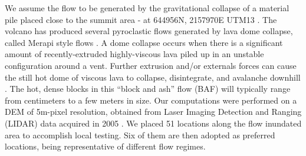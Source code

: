 \documentclass{article}
\begin{document}
We assume the flow to be generated by the gravitational collapse of a material pile placed close to the summit area - at 644956N, 2157970E UTM13 \citep{Rupp2006,Aghakhani2016}. The volcano has produced several pyroclastic flows generated by lava dome collapse, called Merapi style flows \citep{Macorps2017}. A dome collapse occurs when there is a significant amount of recently-extruded highly-viscous lava piled up in an unstable configuration around a vent. Further extrusion and/or externals forces can cause the still hot dome of viscous lava to collapse, disintegrate, and avalanche downhill \citep{Bursik2005, Wolpert2016, Hyman2018}. The hot, dense blocks in this ``block and ash'' flow (BAF) will typically range from centimeters to a few meters in size. Our computations were performed on a DEM of 5m-pixel resolution, obtained from Laser Imaging Detection and Ranging (LIDAR) data acquired in 2005 \citep{Davila2007, Sulpizio2010}. We placed 51 locations along the flow inundated area to accomplish local testing. Six of them are then adopted as preferred locations, being representative of different flow regimes.
\end{document}

